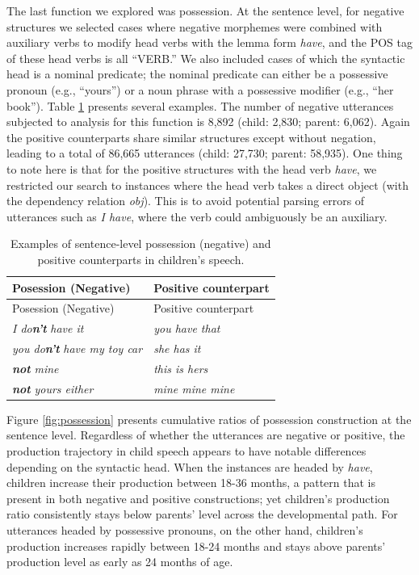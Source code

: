 \documentclass[
  english,
  man,floatsintext]{apa6}
\begin{document}
The last function we explored was possession. At the sentence level, for negative structures we selected cases where negative morphemes were combined with auxiliary verbs to modify head verbs with the lemma form \emph{have}, and the POS tag of these head verbs is all ``VERB.'' We also included cases of which the syntactic head is a nominal predicate; the nominal predicate can either be a possessive pronoun (e.g., ``yours'') or a noun phrase with a possessive modifier (e.g., ``her book''). Table \ref{tab:possess} presents several examples. The number of negative utterances subjected to analysis for this function is 8,892 (child: 2,830; parent: 6,062). Again the positive counterparts share similar structures except without negation, leading to a total of 86,665 utterances (child: 27,730; parent: 58,935). One thing to note here is that for the positive structures with the head verb \emph{have}, we restricted our search to instances where the head verb takes a direct object (with the dependency relation \emph{obj}). This is to avoid potential parsing errors of utterances such as \emph{I have}, where the verb could ambiguously be an auxiliary.

\begin{longtable}[]{@{}ll@{}}
\caption{\label{tab:possess} Examples of sentence-level possession (negative) and positive counterparts in children's speech.}\tabularnewline
\toprule
Posession (Negative) & Positive counterpart \\
\midrule
\endfirsthead
\toprule
Posession (Negative) & Positive counterpart \\
\midrule
\endhead
\emph{I do}\textbf{\emph{n't}} \emph{have it} & \emph{you have that} \\
\emph{you do}\textbf{\emph{n't}} \emph{have my toy car} & \emph{she has it} \\
\textbf{\emph{not}} \emph{mine} & \emph{this is hers} \\
\textbf{\emph{not}} \emph{yours either} & \emph{mine mine mine} \\
\bottomrule
\end{longtable}

Figure \ref{fig:possession} presents cumulative ratios of possession construction at the sentence level. Regardless of whether the utterances are negative or positive, the production trajectory in child speech appears to have notable differences depending on the syntactic head. When the instances are headed by \emph{have}, children increase their production between 18-36 months, a pattern that is present in both negative and positive constructions; yet children's production ratio consistently stays below parents' level across the developmental path. For utterances headed by possessive pronouns, on the other hand, children's production increases rapidly between 18-24 months and stays above parents' production level as early as 24 months of age.
\end{document}
